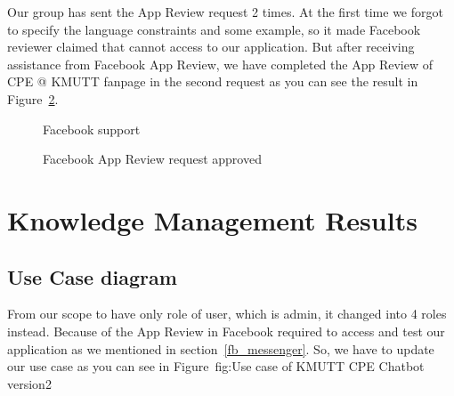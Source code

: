 \documentclass[12pt,oneside,openright,a4paper]{cpe-english-project}
\begin{document}
	Our group has sent the App Review request 2 times. At the first time we forgot to specify the
	language constraints and some example, so it made Facebook reviewer claimed that
	cannot access to our application. But after receiving assistance from Facebook App Review,
	we have completed the App Review of CPE @ KMUTT fanpage in the second request
	as you can see the result in Figure~\ref*{fig:app_review_approved}.

	\begin{figure}[!h]\centering
		\caption{Facebook support}\label{fig:Facebook support}
	\end{figure}

	\begin{figure}[!h]\centering
		\caption{Facebook App Review request approved}\label{fig:app_review_approved}
	\end{figure}

\pagebreak
\section{Knowledge Management Results}
	\subsection{Use Case diagram}
	From our scope to have only role of user, which is admin, it changed into 4 roles instead.
	Because of the App Review in Facebook required to access and test our application
	as we mentioned in section~\ref*{fb_messenger}.
	So, we have to update our use case as you can see in Figure~{fig:Use case of KMUTT CPE Chatbot version2}
\end{document}
